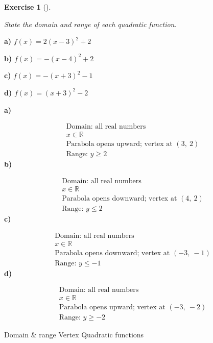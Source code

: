 \documentclass[
  letterpaper,
  DIV=11,
  numbers=noendperiod]{scrreprt}
\theoremstyle{definition}
\newtheorem{exercise}{Exercise}[chapter]
\theoremstyle{remark}
\begin{document}
\begin{exercise}[]\protect\hypertarget{exr-u7-28}{}\label{exr-u7-28}

\emph{State the domain and range of each quadratic function.}

\textbf{a)} \(\displaystyle f(x) = 2(x - 3)^2 + 2\)

\textbf{b)} \(\displaystyle f(x) = -(x - 4)^2 + 2\)

\textbf{c)} \(\displaystyle f(x) = -(x + 3)^2 - 1\)

\textbf{d)} \(\displaystyle f(x) = (x + 3)^2 - 2\)

\begin{tcolorbox}[enhanced jigsaw, opacitybacktitle=0.6, coltitle=black, arc=.35mm, colframe=quarto-callout-tip-color-frame, colback=white, bottomrule=.15mm, left=2mm, colbacktitle=quarto-callout-tip-color!10!white, titlerule=0mm, opacityback=0, title=\textcolor{quarto-callout-tip-color}{\faLightbulb}\hspace{0.5em}{🔍 View Solutions}, leftrule=.75mm, breakable, rightrule=.15mm, bottomtitle=1mm, toptitle=1mm, toprule=.15mm]

\textbf{a)}

\[
\begin{aligned}
\text{Domain: all real numbers} \\[4pt] x \in \mathbb{R} \\[4pt] \text{Parabola opens upward; vertex at }(3,\ 2) \\[4pt] \text{Range: } y \geq 2
\end{aligned}
\] \textbf{b)}

\[
\begin{aligned}
\text{Domain: all real numbers} \\[4pt] x \in \mathbb{R} \\[4pt] \text{Parabola opens downward; vertex at }(4,\ 2) \\[4pt] \text{Range: } y \leq 2
\end{aligned}
\] \textbf{c)}

\[
\begin{aligned}
\text{Domain: all real numbers} \\[4pt] x \in \mathbb{R} \\[4pt] \text{Parabola opens downward; vertex at }(-3,\ -1) \\[4pt] \text{Range: } y \leq -1
\end{aligned}
\] \textbf{d)}

\[
\begin{aligned}
\text{Domain: all real numbers} \\[4pt] x \in \mathbb{R} \\[4pt] \text{Parabola opens upward; vertex at }(-3,\ -2) \\[4pt] \text{Range: } y \geq -2
\end{aligned}
\]

\end{tcolorbox}

{Domain \& range} {Vertex} {Quadratic functions}

\end{exercise}
\end{document}
